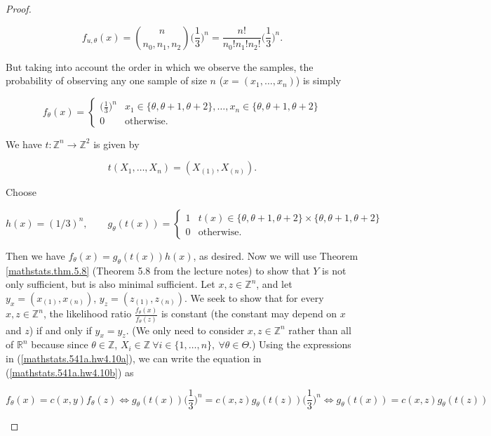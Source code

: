 \begin{proof}
\begin{enumerate}[(a)]
\[
f_{u,\theta}(x) = \binom{n}{n_0, n_1, n_2}  \bigg( \frac{1}{3} \bigg)^n = \frac{n!}{n_0! n_1! n_2!}  \bigg( \frac{1}{3} \bigg)^n.
\]

But taking into account the order in which we observe the samples, the probability of observing any one sample of size \(n\) (\(x = (x_1, \ldots, x_n)\)) is simply

\[
f_\theta(x) =  \begin{cases}
\big( \frac{1}{3} \big)^n & x_1 \in \{\theta, \theta +1, \theta + 2\}, \ldots, x_n \in  \{\theta, \theta +1, \theta + 2\} \\
0 & \text{otherwise.}
\end{cases}
\]

We have \(t: \mathbb{Z}^n \to \mathbb{Z}^2\) is given by

\[
t(X_1, \ldots, X_n) = (X_{(1)}, X_{(n)}).
\]

Choose

\begin{equation}\label{mathstats.541a.hw4.10a}
h(x) = (1/3)^n, \qquad g_\theta(t(x)) = \begin{cases}
1 & t(x) \in  \{\theta, \theta + 1, \theta + 2\} \times \{\theta, \theta +1, \theta + 2\} \\
0 & \text{otherwise}.
\end{cases}
\end{equation}

Then we have \(f_\theta(x) = g_\theta(t(x)) h(x)\), as desired. Now we will use Theorem \ref{mathstats.thm.5.8} (Theorem 5.8 from the lecture notes) to show that \(Y\) is not only sufficient, but is also minimal sufficient. Let \(x, z \in \mathbb{Z}^n\), and let \(y_x = (x_{(1)}, x_{(n)})\), \(y_z = (z_{(1)}, z_{(n)})\). We seek to show that for every \(x, z \in \mathbb{Z}^n\), the likelihood ratio \(\frac{f_\theta(x)}{f_\theta(z)}\) is constant (the constant may depend on \(x\) and \(z\)) if and only if \(y_x = y_z\). (We only need to consider \(x, z \in \mathbb{Z}^n\) rather than all of \(\mathbb{R}^n\) because since \(\theta \in \mathbb{Z}\), \(X_i \in \mathbb{Z} \ \forall i \in \{1, \ldots, n\}, \ \forall \theta \in \Theta\).) Using the expressions in  (\ref{mathstats.541a.hw4.10a}), we can write the equation in (\ref{mathstats.541a.hw4.10b}) as

\begin{equation}\label{mathstats.541a.hw4.10b}
f_\theta(x) = c(x,y) f_\theta(z) \iff g_\theta(t(x)) \bigg( \frac{1}{3} \bigg)^n  =  c(x,z) g_\theta(t(z)) \bigg( \frac{1}{3} \bigg)^n \iff g_\theta(t(x))  =  c(x,z) g_\theta(t(z)) 
\end{equation}


\end{enumerate}
\end{proof}
